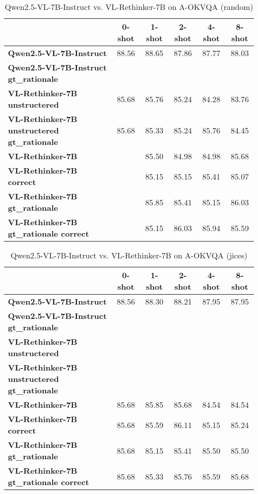 \begin{table}
\caption{Qwen2.5-VL-7B-Instruct vs. VL-Rethinker-7B on A-OKVQA (random)}
\label{tab:Qwen2.5-VL-7B-Instruct_A-OKVQA_TRAIN_random}
\begin{tabular}{lccccc}
\toprule
 & 0-shot & 1-shot & 2-shot & 4-shot & 8-shot \\
\midrule
\textbf{Qwen2.5-VL-7B-Instruct} & 88.56 & 88.65 & 87.86 & 87.77 & 88.03 \\
\textbf{Qwen2.5-VL-7B-Instruct gt\_rationale} &  &  &  &  &  \\
\textbf{VL-Rethinker-7B unstructered} & 85.68 & 85.76 & 85.24 & 84.28 & 83.76 \\
\textbf{VL-Rethinker-7B unstructered gt\_rationale} & 85.68 & 85.33 & 85.24 & 85.76 & 84.45 \\
\textbf{VL-Rethinker-7B} &  & 85.50 & 84.98 & 84.98 & 85.68 \\
\textbf{VL-Rethinker-7B correct} &  & 85.15 & 85.15 & 85.41 & 85.07 \\
\textbf{VL-Rethinker-7B gt\_rationale} &  & 85.85 & 85.41 & 85.15 & 86.03 \\
\textbf{VL-Rethinker-7B gt\_rationale correct} &  & 85.15 & 86.03 & 85.94 & 85.59 \\
\bottomrule
\end{tabular}
\end{table}


\begin{table}
\caption{Qwen2.5-VL-7B-Instruct vs. VL-Rethinker-7B on A-OKVQA (jices)}
\label{tab:Qwen2.5-VL-7B-Instruct_A-OKVQA_TRAIN_jices}
\begin{tabular}{lccccc}
\toprule
 & 0-shot & 1-shot & 2-shot & 4-shot & 8-shot \\
\midrule
\textbf{Qwen2.5-VL-7B-Instruct} & 88.56 & 88.30 & 88.21 & 87.95 & 87.95 \\
\textbf{Qwen2.5-VL-7B-Instruct gt\_rationale} &  &  &  &  &  \\
\textbf{VL-Rethinker-7B unstructered} &  &  &  &  &  \\
\textbf{VL-Rethinker-7B unstructered gt\_rationale} &  &  &  &  &  \\
\textbf{VL-Rethinker-7B} & 85.68 & 85.85 & 85.68 & 84.54 & 84.54 \\
\textbf{VL-Rethinker-7B correct} & 85.68 & 85.59 & 86.11 & 85.15 & 85.24 \\
\textbf{VL-Rethinker-7B gt\_rationale} & 85.68 & 85.15 & 85.41 & 85.50 & 85.50 \\
\textbf{VL-Rethinker-7B gt\_rationale correct} & 85.68 & 85.33 & 85.76 & 85.59 & 85.68 \\
\bottomrule
\end{tabular}
\end{table}


